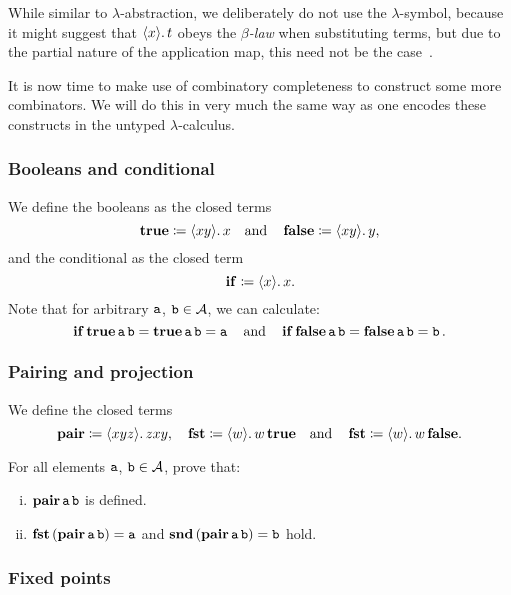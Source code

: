 \begin{remark}
  While similar to \(\lambda\)-abstraction, we deliberately do not use the
  \(\lambda\)-symbol, because it might suggest that \(\lambdapca{x}{t}\) obeys the
  \emph{\(\beta\)-law} when substituting terms, but due to the partial nature of
  the application map, this need not be the case~\cite[p.~4]{vanOosten2008}.
\end{remark}

It is now time to make use of combinatory completeness to construct some more
combinators. We will do this in very much the same way as one encodes these
constructs in the untyped \(\lambda\)-calculus.

\subsubsection*{Booleans and conditional}

We define the booleans as the closed terms
\[
  \pcatrue \coloneqq \lambdapca{xy}{x} \quad\text{and}\quad \pcafalse \coloneqq
  \lambdapca{xy}{y},
\]
and the conditional as the closed term
\[
  \pcaif \coloneq \lambdapca{x}{x}.
\]
%
Note that for arbitrary \(\pca{a}\), \(\pca{b} \in \AA\), we can calculate:
\[
  \pcaif\pcatrue\pca{a}\pca{b} = \pcatrue\pca{a}\pca{b} = \pca{a}
  \quad
  \text{and}
  \quad
  \pcaif\pcafalse\pca{a}\pca{b} = \pcafalse\pca{a}\pca{b} = \pca{b}.
\]

\subsubsection*{Pairing and projection}

We define the closed terms
\[
  \pcapair \coloneqq \lambdapca{xyz}{z}{xy},
  \quad
  \pcafst \coloneqq \lambdapca{w}{w\pcatrue}
  \quad
  \text{and}
  \quad
  \pcafst \coloneqq \lambdapca{w}{w\pcafalse}.
\]

\begin{exercise}\label{exer:pairing-projection}
  For all elements \(\pca{a}\), \(\pca{b} \in \AA\), prove that:
  \begin{enumerate}[(i)]
  \item \(\pcapair \pca{a} \pca{b}\) is defined.
  \item \(\pcafst{(\pcapair\pca{a}\pca{b})} = \pca{a}\) and
    \(\pcasnd{(\pcapair\pca{a}\pca{b})} = \pca{b}\) hold.
  \end{enumerate}
\end{exercise}

\subsubsection*{Fixed points}

